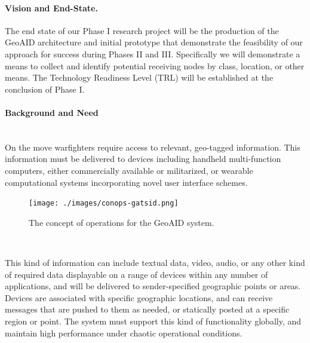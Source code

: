 \documentclass{sbir}
\begin{document}
\paragraph{Vision and End-State.} The end state of our Phase I research project will be the production of the GeoAID architecture and initial prototype that demonstrate the feasibility of our approach for success during Phases II and III. Specifically we will demonstrate a means to collect and identify potential receiving nodes by class, location, or other means. The Technology Readiness Level (TRL) will be established at the conclusion of Phase I.

\paragraph{Background and Need}~\\
On the move warfighters require access to relevant, geo-tagged information. This information must be delivered to devices including handheld multi-function computers, either commercially available or militarized, or wearable computational systems incorporating novel user interface schemes.

\begin{figure}
  \centerline{\texttt{[image: ./images/conops-gatsid.png]}}
  \caption{The concept of operations for the GeoAID system.}
  \label{conops}
\end{figure}


~\\

This kind of information can include textual data, video, audio, or any other kind of required data displayable on a range of devices within any number of applications, and will be  delivered to sender-specified geographic points or areas. Devices are associated with specific geographic locations, and can receive messages that are pushed to them as needed, or statically posted at a specific region or point. The system must support this kind of functionality globally, and maintain high performance under chaotic operational conditions.
\end{document}
